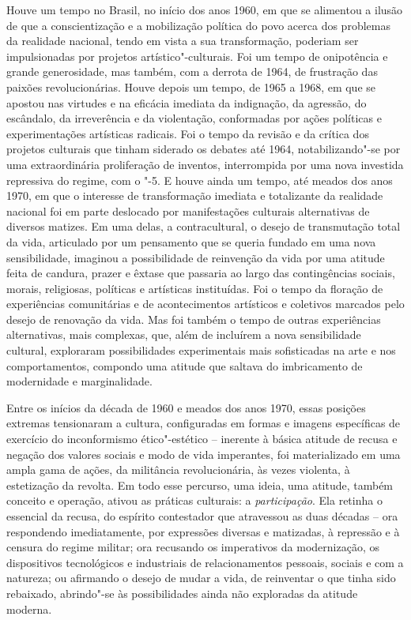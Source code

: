 \movetooddpage

Houve um tempo no Brasil, no início dos anos 1960, em que se alimentou a
ilusão de que a conscientização e a mobilização política do povo acerca
dos problemas da realidade nacional, tendo em vista a sua transformação,
poderiam ser impulsionadas por projetos artístico"-culturais. Foi um
tempo de onipotência e grande generosidade, mas também, com a derrota de
1964, de frustração das paixões revolucionárias. Houve depois um tempo,
de 1965 a 1968, em que se apostou nas virtudes e na eficácia imediata da
indignação, da agressão, do escândalo, da irreverência e da violentação,
conformadas por ações políticas e experimentações artísticas radicais.
Foi o tempo da revisão e da crítica dos projetos culturais que tinham
siderado os debates até 1964, notabilizando"-se por uma extraordinária
proliferação de inventos, interrompida por uma nova investida repressiva
do regime, com o "-5. E houve ainda um tempo, até meados dos anos 1970,
em que o interesse de transformação imediata e totalizante da realidade
nacional foi em parte deslocado por manifestações culturais alternativas
de diversos matizes. Em uma delas, a contracultural, o desejo de
transmutação total da vida, articulado por um pensamento que se queria
fundado em uma nova sensibilidade, imaginou a possibilidade de
reinvenção da vida por uma atitude feita de candura, prazer e êxtase que
passaria ao largo das contingências sociais, morais, religiosas,
políticas e artísticas instituídas. Foi o tempo da floração de
experiências comunitárias e de acontecimentos artísticos e coletivos
marcados pelo desejo de renovação da vida. Mas foi também o tempo de
outras experiências alternativas, mais complexas, que, além de incluírem
a nova sensibilidade cultural, exploraram possibilidades experimentais
mais sofisticadas na arte e nos comportamentos, compondo uma atitude que
saltava do imbricamento de modernidade e marginalidade.

Entre os inícios da década de 1960 e meados dos anos 1970, essas
posições extremas tensionaram a cultura, configuradas em formas e
imagens específicas de exercício do inconformismo ético"-estético --
inerente à básica atitude de recusa e negação dos valores sociais e modo
de vida imperantes, foi materializado em uma ampla gama de ações, da
militância revolucionária, às vezes violenta, à estetização da revolta.
Em todo esse percurso, uma ideia, uma atitude, também conceito e
operação, ativou as práticas culturais: a \emph{participação}. Ela
retinha o essencial da recusa, do espírito contestador que atravessou as
duas décadas -- ora respondendo imediatamente, por expressões diversas e
matizadas, à repressão e à censura do regime militar; ora recusando os
imperativos da modernização, os dispositivos tecnológicos e industriais
de relacionamentos pessoais, sociais e com a natureza; ou afirmando o
desejo de mudar a vida, de reinventar o que tinha sido rebaixado,
abrindo"-se às possibilidades ainda não exploradas da atitude moderna.

